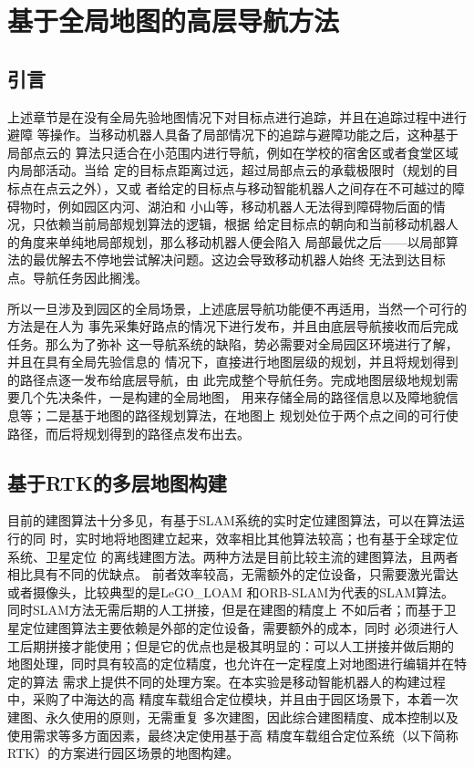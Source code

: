 \section{基于全局地图的高层导航方法}
\subsection{引言}
上述章节是在没有全局先验地图情况下对目标点进行追踪，并且在追踪过程中进行避障
等操作。当移动机器人具备了局部情况下的追踪与避障功能之后，这种基于局部点云的
算法只适合在小范围内进行导航，例如在学校的宿舍区或者食堂区域内局部活动。当给
定的目标点距离过远，超过局部点云的承载极限时（规划的目标点在点云之外），又或
者给定的目标点与移动智能机器人之间存在不可越过的障碍物时，例如园区内河、湖泊和
小山等，移动机器人无法得到障碍物后面的情况，只依赖当前局部规划算法的逻辑，根据
给定目标点的朝向和当前移动机器人的角度来单纯地局部规划，那么移动机器人便会陷入
局部最优之后——以局部算法的最优解去不停地尝试解决问题。这边会导致移动机器人始终
无法到达目标点。导航任务因此搁浅。

所以一旦涉及到园区的全局场景，上述底层导航功能便不再适用，当然一个可行的方法是在人为
事先采集好路点的情况下进行发布，并且由底层导航接收而后完成任务。那么为了弥补
这一导航系统的缺陷，势必需要对全局园区环境进行了解，并且在具有全局先验信息的
情况下，直接进行地图层级的规划，并且将规划得到的路径点逐一发布给底层导航，由
此完成整个导航任务。完成地图层级地规划需要几个先决条件，一是构建的全局地图，
用来存储全局的路径信息以及障地貌信息等；二是基于地图的路径规划算法，在地图上
规划处位于两个点之间的可行使路径，而后将规划得到的路径点发布出去。

\subsection{基于RTK的多层地图构建}
目前的建图算法十分多见，有基于SLAM系统的实时定位建图算法，可以在算法运行的同
时，实时地将地图建立起来，效率相比其他算法较高；也有基于全球定位系统、卫星定位
的离线建图方法。两种方法是目前比较主流的建图算法，且两者相比具有不同的优缺点。
前者效率较高，无需额外的定位设备，只需要激光雷达或者摄像头，比较典型的是LeGO\_LOAM
和ORB-SLAM为代表的SLAM算法。同时SLAM方法无需后期的人工拼接，但是在建图的精度上
不如后者；而基于卫星定位建图算法主要依赖是外部的定位设备，需要额外的成本，同时
必须进行人工后期拼接才能使用；但是它的优点也是极其明显的：可以人工拼接并做后期的
地图处理，同时具有较高的定位精度，也允许在一定程度上对地图进行编辑并在特定的算法
需求上提供不同的处理方案。在本实验是移动智能机器人的构建过程中，采购了中海达的高
精度车载组合定位模块，并且由于园区场景下，本着一次建图、永久使用的原则，无需重复
多次建图，因此综合建图精度、成本控制以及使用需求等多方面因素，最终决定使用基于高
精度车载组合定位系统（以下简称RTK）的方案进行园区场景的地图构建。

